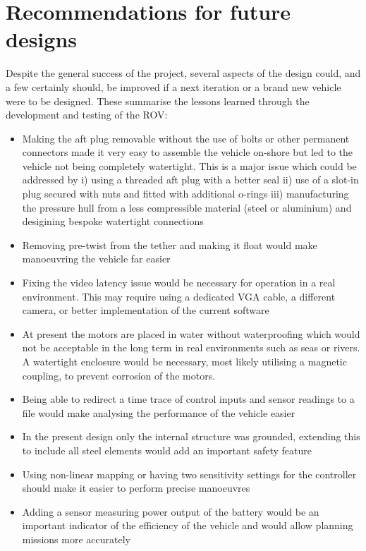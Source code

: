 \section{Recommendations for future designs}

Despite the general success of the project, several aspects of the design could,
and a few certainly should, be improved if a next iteration or a brand new vehicle
were to be designed. These summarise the lessons learned through the development
and testing of the ROV:
%
\begin{itemize}
\item Making the aft plug removable without the use of bolts or other permanent
	connectors made it very easy to assemble the vehicle on-shore but led to
	the vehicle not being completely watertight. This is a major issue which
	could be addressed by i) using a threaded aft plug with a better seal
	ii) use of a slot-in plug secured with nuts and fitted with additional o-rings
	iii) manufacturing the pressure hull from a less compressible material (steel
	or aluminium) and desigining bespoke watertight connections
\item Removing pre-twist from the tether and making it float would make manoeuvring
	the vehicle far easier
\item Fixing the video latency issue would be necessary for operation in a real
	environment. This may require using a dedicated VGA cable, a different camera,
	or better implementation of the current software
\item At present the motors are placed in water without waterproofing which would not
	be acceptable in the long term in real environments such as seas or rivers.
	A watertight enclosure would be necessary, most likely utilising a magnetic
	coupling, to prevent corrosion of the motors.
\item Being able to redirect a time trace of control inputs and sensor readings to a file
	would make analysing the performance of the vehicle easier
\item In the present design only the internal structure was grounded, extending this
	to include all steel elements would add an important safety feature
\item Using non-linear mapping or having two sensitivity settings for the controller
	should make it easier to perform precise manoeuvres
\item Adding a sensor measuring power output of the battery would be an important
	indicator of the efficiency of the vehicle and would allow planning missions more accurately

\end{itemize}
